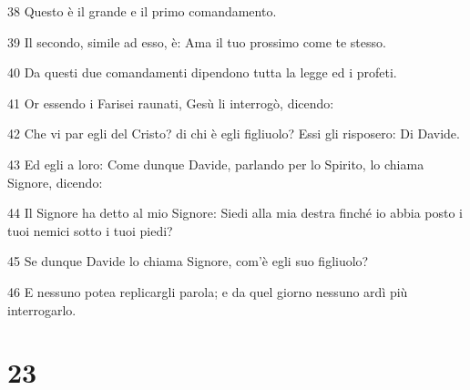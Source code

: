 \par 38 Questo è il grande e il primo comandamento.
\par 39 Il secondo, simile ad esso, è: Ama il tuo prossimo come te stesso.
\par 40 Da questi due comandamenti dipendono tutta la legge ed i profeti.
\par 41 Or essendo i Farisei raunati, Gesù li interrogò, dicendo:
\par 42 Che vi par egli del Cristo? di chi è egli figliuolo? Essi gli risposero: Di Davide.
\par 43 Ed egli a loro: Come dunque Davide, parlando per lo Spirito, lo chiama Signore, dicendo:
\par 44 Il Signore ha detto al mio Signore: Siedi alla mia destra finché io abbia posto i tuoi nemici sotto i tuoi piedi?
\par 45 Se dunque Davide lo chiama Signore, com'è egli suo figliuolo?
\par 46 E nessuno potea replicargli parola; e da quel giorno nessuno ardì più interrogarlo.

\chapter{23}

